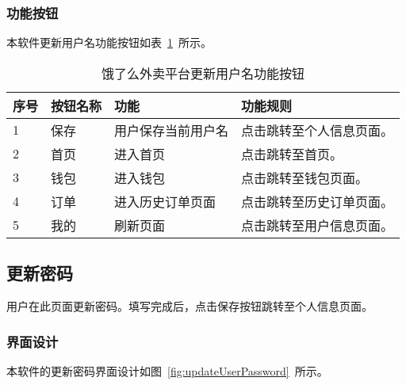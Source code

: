 \subsubsection{功能按钮}
本软件更新用户名功能按钮如表~\ref{tab:table17}~所示。
\begin{table}[htbp]
    \caption{饿了么外卖平台更新用户名功能按钮}\label{tab:table17}
    \vspace{0.5em}\wuhao
    \begin{tabularx}{\textwidth}{lllX}
    \toprule[1.5pt]
    序号 & 按钮名称 & 功能 & 功能规则 \\ 
    \midrule[1pt]
    1 & 保存 & 用户保存当前用户名 & 点击跳转至个人信息页面。 \\
    2 & 首页 & 进入首页 & 点击跳转至首页。 \\
    3 & 钱包 & 进入钱包 & 点击跳转至钱包页面。 \\
    4 & 订单 & 进入历史订单页面 & 点击跳转至历史订单页面。 \\
    5 & 我的 & 刷新页面 & 点击跳转至用户信息页面。 \\
\bottomrule[1.5pt]
\end{tabularx}
\vspace{\baselineskip}
\end{table}

\subsection{更新密码}
用户在此页面更新密码。填写完成后，点击保存按钮跳转至个人信息页面。
\subsubsection{界面设计}
本软件的更新密码界面设计如图~\ref{fig:updateUserPassword}~所示。
